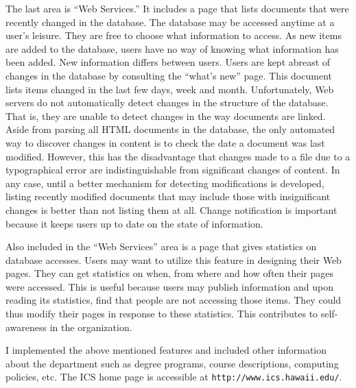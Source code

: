 The last area is ``Web Services.''  It includes a page that lists documents
that were recently changed in the database.  The database may be accessed
anytime at a user's leisure.  They are free to choose what information to
access.  As new items are added to the database, users have no way of knowing
what information has been added.  New information differs between users.  Users
are kept abreast of changes in the database by consulting the ``what's new''
page.  This document lists items changed in the last few days, week and month.
Unfortunately, Web servers do not automatically detect changes in the structure
of the database.  That is, they are unable to detect changes in the way
documents are linked.  Aside from parsing all HTML documents in the database,
the only automated way to discover changes in content is to check the date a
document was last modified.  However, this has the disadvantage that changes
made to a file due to a typographical error are indistinguishable from
significant changes of content.  In any case, until a better mechanism for
detecting modifications is developed, listing recently modified documents that
may include those with insignificant changes is better than not listing them at
all.  Change notification is important because it keeps users up to date on the
state of information.

Also included in the ``Web Services'' area is a page that gives statistics on
database accesses.  Users may want to utilize this feature in designing their
Web pages.  They can get statistics on when, from where and how often their
pages were accessed.  This is useful because users may publish information and
upon reading its statistics, find that people are not accessing those items.
They could thus modify their pages in response to these statistics.  This
contributes to self-awareness in the organization.

I implemented the above mentioned features and included other information
about the department such as degree programs, course descriptions, computing
policies, etc.  The ICS home page is accessible at {\tt http://www.ics.hawaii.edu/}.

